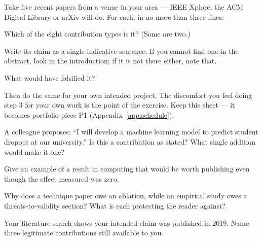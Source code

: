 \begin{lab}
Take five recent papers from a venue in your area --- IEEE Xplore, the ACM
Digital Library or arXiv will do. For each, in no more than three lines:

\begin{tightnum}
  \item Which of the eight contribution types is it? (Some are two.)
  \item Write its claim as a single indicative sentence. If you cannot find one
    in the abstract, look in the introduction; if it is not there either, note
    that.
  \item What would have falsified it?
\end{tightnum}

\medskip
Then do the same for your own intended project. The discomfort you feel doing
step 3 for your own work is the point of the exercise. Keep this sheet --- it
becomes portfolio piece P1 (Appendix~\ref{app:schedule}).
\end{lab}

\begin{checkpoint}
\begin{tightnum}
  \item A colleague proposes: ``I will develop a machine learning model to
    predict student dropout at our university.'' Is this a contribution as
    stated? What single addition would make it one?
  \item Give an example of a result in computing that would be worth
    publishing even though the effect measured was zero.
  \item Why does a technique paper owe an ablation, while an empirical study
    owes a threats-to-validity section? What is each protecting the reader
    against?
  \item Your literature search shows your intended claim was published in 2019.
    Name three legitimate contributions still available to you.
\end{tightnum}
\end{checkpoint}

